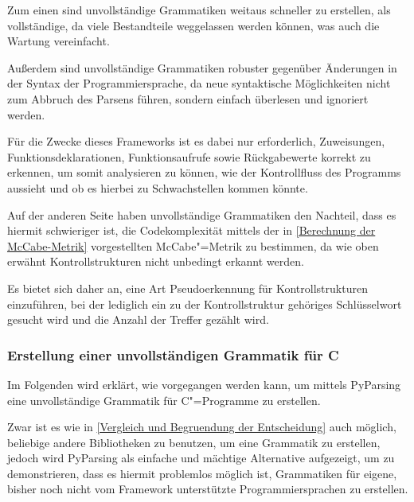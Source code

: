             Zum einen sind unvollständige Grammatiken weitaus schneller zu erstellen,
            als vollständige,
            da viele Bestandteile weggelassen werden können,
            was auch die Wartung vereinfacht.

            Außerdem sind unvollständige Grammatiken robuster gegenüber Änderungen in der Syntax der Programmiersprache,
            da neue syntaktische Möglichkeiten nicht zum Abbruch des Parsens führen,
            sondern einfach überlesen und
            ignoriert werden.

            Für die Zwecke dieses Frameworks ist es dabei nur erforderlich,
            Zuweisungen,
            Funktionsdeklarationen,
            Funktionsaufrufe sowie
            Rückgabewerte korrekt zu erkennen,
            um somit analysieren zu können,
            wie der Kontrollfluss des Programms aussieht und
            ob es hierbei zu Schwachstellen kommen könnte.

            Auf der anderen Seite haben unvollständige Grammatiken den Nachteil,
            dass es hiermit schwieriger ist,
            die Codekomplexität mittels der in
            \vref{Berechnung der McCabe-Metrik} vorgestellten McCabe"=Metrik zu bestimmen,
            da
            wie oben erwähnt Kontrollstrukturen nicht unbedingt erkannt werden.

            Es bietet sich daher an,
            eine Art Pseudoerkennung für Kontrollstrukturen einzuführen,
            bei der lediglich ein zu der Kontrollstruktur gehöriges Schlüsselwort gesucht wird und
            die Anzahl der Treffer gezählt wird.

            \subsubsection{Erstellung einer unvollständigen Grammatik für C}
                Im Folgenden wird erklärt,
                wie vorgegangen werden kann,
                um mittels PyParsing eine unvollständige Grammatik für C"=Programme zu erstellen.

                Zwar ist es
                wie in
                \vref{Vergleich und Begruendung der Entscheidung} auch möglich,
                beliebige andere Bibliotheken zu benutzen,
                um eine Grammatik zu erstellen,
                jedoch wird PyParsing als einfache und
                mächtige Alternative aufgezeigt,
                um zu demonstrieren,
                dass es hiermit problemlos möglich ist,
                Grammatiken für eigene,
                bisher noch nicht vom Framework unterstützte Programmiersprachen zu erstellen.

